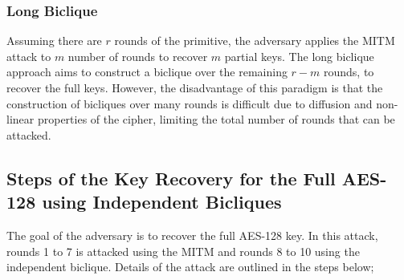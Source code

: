 \documentclass{report}
\begin{document}
 \subsubsection{Long Biclique\cite{bogdanov2011biclique}}
 Assuming there are $r$ rounds of the primitive, the adversary applies the MITM attack to $m$ number of rounds to recover $m$ partial keys. The long biclique approach aims to construct a biclique over the remaining $r-m$ rounds, to recover the full keys. However, the disadvantage of this paradigm is that the construction of bicliques over many rounds is difficult due to diffusion and non-linear properties of the cipher, limiting the total number of rounds that can be attacked.


 \subsection{Steps of the Key Recovery for the Full AES-128 using Independent Bicliques}
The goal of the adversary is to recover the full AES-128 key. In this attack, rounds 1 to 7 is attacked using the MITM and rounds 8 to 10 using the independent biclique. Details of the attack are outlined in the steps below; 
\end{document}
